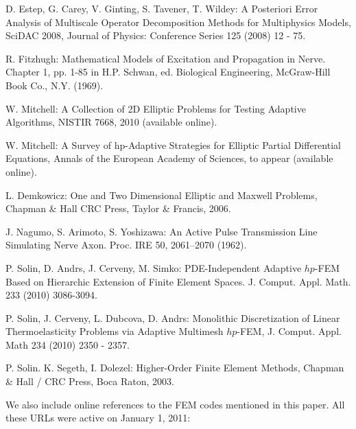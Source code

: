 \begin{thebibliography}{[KLR73]}

D. Estep, G. Carey, V. Ginting, S. Tavener, T. Wildey:
A Posteriori Error Analysis of Multiscale Operator
Decomposition Methods for Multiphysics Models, SciDAC 2008,
Journal of Physics: Conference Series 125 (2008) 12 - 75.

R. Fitzhugh: Mathematical Models of Excitation and Propagation in Nerve.
Chapter 1, pp. 1-85 in H.P. Schwan, ed. Biological Engineering,
McGraw-Hill Book Co., N.Y. (1969).

W. Mitchell: A Collection of 2D Elliptic Problems for
Testing Adaptive Algorithms, NISTIR 7668, 2010 (available online).

W. Mitchell: A Survey of hp-Adaptive Strategies for Elliptic Partial Differential Equations,
Annals of the European Academy of Sciences, to appear (available online).

L. Demkowicz: One and Two Dimensional Elliptic and Maxwell Problems, 
Chapman \& Hall \/ CRC Press, Taylor \& Francis, 2006.

J. Nagumo, S. Arimoto, S. Yoshizawa:
An Active Pulse Transmission Line Simulating Nerve Axon. Proc. IRE 50, 2061–2070 (1962).

P. Solin, D. Andrs, J. Cerveny, M. Simko:
PDE-Independent Adaptive $hp$-FEM Based on Hierarchic Extension of Finite Element Spaces.
J. Comput. Appl. Math. 233 (2010) 3086-3094.

P. Solin, J. Cerveny, L. Dubcova, D. Andrs:
Monolithic Discretization of Linear Thermoelasticity Problems
via Adaptive Multimesh $hp$-FEM, J. Comput. Appl. Math 234 (2010) 2350 - 2357.

P. Solin. K. Segeth, I. Dolezel: Higher-Order Finite Element Methods, Chapman \& Hall
/ CRC Press, Boca Raton, 2003.
\end{thebibliography}

\vbox{}
\vspace{6mm}
We also include online references to the FEM codes mentioned in this paper.
All these URLs were active on January 1, 2011:


